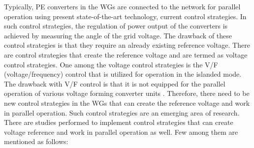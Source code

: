 Typically, \gls{PE} converters in the \gls{WG}s are connected to the network for parallel operation using present state-of-the-art technology, current control strategies. In such control strategies, the regulation of power output of the converters is achieved by measuring the angle of the grid voltage. The drawback of these control strategies is that they require an already existing reference voltage. There are control strategies that create the reference voltage and are termed as voltage control strategies. One among the voltage control strategies is the V/F (voltage/frequency) control that is utilized for operation in the islanded mode. The drawback with V/F control is that it is not equipped for the parallel operation of various voltage forming converter units \cite{weise2019comparison}. Therefore, there need to be new control strategies in the \gls{WG}s that can create the reference voltage and work in parallel operation. Such control strategies are an emerging area of research. There are studies performed to implement control strategies that can create voltage reference and work in parallel operation as well. Few among them are mentioned as follows:


